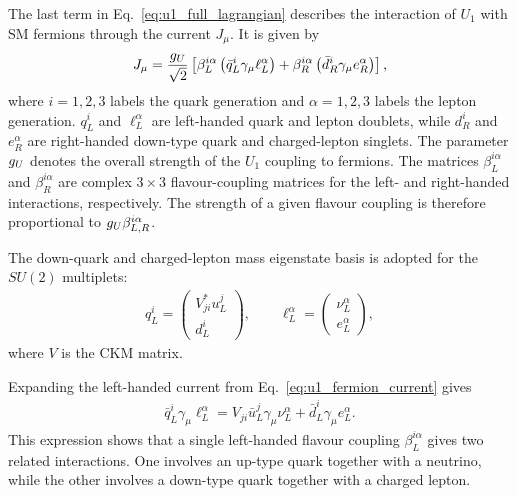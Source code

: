 The last term in Eq.~\eqref{eq:u1_full_lagrangian} describes the interaction of $U_{1}$ with SM fermions through the current $J_{\mu}$. It is given by
\begin{align}
    J_{\mu}
    =
    \frac{g_U}{\sqrt{2}}
    \left[
        \beta_{L}^{i\alpha}
        \left(
            \bar{q}_{L}^{i}
            \gamma_{\mu}
            \ell_{L}^{\alpha}
        \right)
        +
        \beta_{R}^{i\alpha}
        \left(
            \bar{d}_{R}^{i}
            \gamma_{\mu}
            e_{R}^{\alpha}
        \right)
    \right],
    \label{eq:u1_fermion_current}
\end{align}
where $i=1,2,3$ labels the quark generation and $\alpha=1,2,3$ labels the lepton generation. $q_{L}^{i}$ and $\ell_{L}^{\alpha}$ are left-handed quark and lepton doublets, while $d_{R}^{i}$ and $e_{R}^{\alpha}$ are right-handed down-type quark and charged-lepton singlets. 
The parameter $g_U$ denotes the overall strength of the $U_{1}$ coupling to fermions. 
The matrices $\beta_{L}^{i\alpha}$ and $\beta_{R}^{i\alpha}$ are complex $3\times3$ flavour-coupling matrices for the left- and right-handed interactions, respectively. 
The strength of a given flavour coupling is therefore proportional to $g_U\beta_{L,R}^{i\alpha}$.

The down-quark and charged-lepton mass eigenstate basis is adopted for the $SU(2)$ multiplets:
\begin{align*}
    q_{L}^{i}
    =
    \begin{pmatrix}
        V_{ji}^{*}u_{L}^{j}\\
        d_{L}^{i}
    \end{pmatrix},
    \qquad
    \ell_{L}^{\alpha}
    =
    \begin{pmatrix}
        \nu_{L}^{\alpha}\\
        e_{L}^{\alpha}
    \end{pmatrix},
\end{align*}
where $V$ is the CKM matrix. 

Expanding the left-handed current from Eq.~\eqref{eq:u1_fermion_current} gives
\begin{align}
    \bar{q}_{L}^{i}
    \gamma_{\mu}
    \ell_{L}^{\alpha}
    =
    V_{ji}
    \bar{u}_{L}^{j}
    \gamma_{\mu}
    \nu_{L}^{\alpha}
    +
    \bar{d}_{L}^{i}
    \gamma_{\mu}
    e_{L}^{\alpha}.
    \label{eq:u1_current_expanded}
\end{align}
This expression shows that a single left-handed flavour coupling $\beta_{L}^{i\alpha}$ gives two related interactions. 
One involves an up-type quark together with a neutrino, while the other involves a down-type quark together with a charged lepton.

